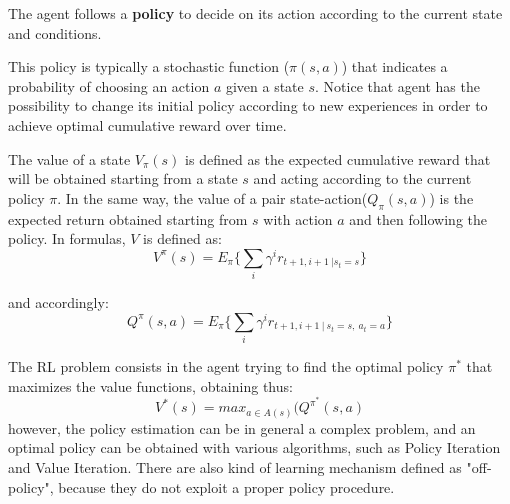 The agent follows a \textbf{policy} to decide on its action according to the current state and conditions. 

This policy is typically a  stochastic  function ($\pi(s,a)$) that  indicates a probability  of  choosing an action $a$ given a state $s$.
Notice that agent has the possibility to change its initial policy  according  to  new experiences  in order to  achieve  optimal cumulative  reward  over  time.  

The  value  of  a  state $V_\pi(s)$  is  defined  as  the  expected  cumulative reward that  will  be  obtained starting from a state $s$ and acting according to the current policy $\pi$. 
In the same way, the value of  a pair state-action($Q_\pi(s,a)$) is  the  expected  return  obtained starting  from  $s$  with  action $a$  and  then following  the policy. 
In formulas, $V$ is defined as:
\begin{equation}
V^\pi(s)=E_\pi \{ \sum_i \gamma^i r_{t+1, i+1 ~ | s_t=s } \}
\end{equation}

and accordingly:
\begin{equation}
Q^\pi(s,a)=E_\pi \{ \sum_i \gamma^i r_{t+1, i+1 ~|~ s_t=s,~ a_t=a } \}
\end{equation}

The RL problem consists in the agent trying to find the optimal policy $\pi^*$ that maximizes the value  functions, obtaining thus:
\begin{equation}
V^*(s)= max_{a \in A(s)}(Q^{\pi^*}(s,a)
\end{equation} 
however, the policy estimation can be in general a complex problem, and an optimal policy can be obtained with various algorithms, such as Policy Iteration and Value Iteration. There are also kind of learning mechanism defined as "off-policy", because they do not exploit a proper policy procedure.

